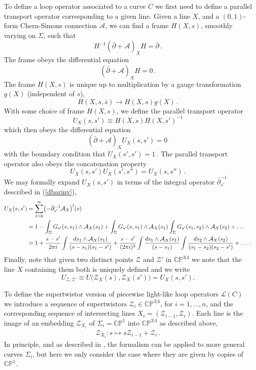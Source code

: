 \documentclass[12pt]{article}
\def \be  {\begin{equation}}
\def \ee  {\end{equation}}
\numberwithin{equation}{section}
\begin{document}
To define a loop operator associated to a curve $C$ we first need to define a parallel transport operator corresponding to a given line.
Given a line $X$, and a $(0,1)$-form Chern-Simons connection $\mathcal{A}$, we can find a frame $H(X,s)$, smoothly varying on $\Sigma$, such that
\be
H^{-1} (\bar{\partial} + \mathcal{A})_X H = \bar{\partial}\,.
\ee
The frame obeys the differential equation
\be
(\bar{\partial} + \mathcal{A})_X H = 0\,.
\ee
The frame $H(X,s)$ is unique up to multiplication by a gauge transformation $g(X)$ (independent of $s$),
\be
H(X,s,\bar{s}) \rightarrow H(X,s) g(X)\,.
\ee
With some choice of frame $H(X,s)$, we define the parallel transport operator
\be
U_X(s,s') \equiv H(X,s) H(X,s')^{-1} 
\ee
which then obeys the differential equation
\be
(\bar{\partial} + \mathcal{A})_{X} U_X(s,s') = 0\,
\label{Ueq}
\ee
with the boundary condition that $U_X(s',s') = 1$\,. The parallel transport operator also obeys the concatenation property
\be
U_X(s,s')U_X(s',s'') = U_X(s,s'')\,.
\ee
We may formally expand $U_X(s,s')$ in terms of the integral operator $\bar{\partial}_{s'}^{-1}$ described in (\ref{dbarinv}),
\begin{align}
\label{UXss'} 
U_{X}(s,s') &= \sum_{l=0}^{\infty} \bigl(-\bar{\partial}_{s'}^{-1} \mathcal{A}_{X}\bigr)^{l}(s) \\
&= 1 - \int_{\Sigma} G_{s'}(s,s_1) \wedge \mathcal{A}_{X}(s_1) + \int_{\Sigma} G_{s'}(s,s_1) \wedge \mathcal{A}_{X}(s_1) \int_{\Sigma} G_{s'}(s_1,s_2) \wedge \mathcal{A}_{X}(s_2) + \ldots\, \notag \\
&= 1 + \frac{s-s'}{2 \pi i} \int  \frac{ds_1 \wedge \mathcal{A}_{X}(s_1)}{(s-s_1)(s_1-s')} + \frac{s-s'}{(2 \pi i)^2} \int \frac{ds_1 \wedge \mathcal{A}_{X}(s_1)}{(s-s_1)} \int \frac{ds_2 \wedge \mathcal{A}_{X}(s_2)}{(s_1-s_2)(s_2-s')} + \ldots\,. \notag
\end{align}
Finally, note that given two distinct points $\mathcal{Z}$ and $\mathcal{Z}'$ in $\mathbb{CP}^{3|4}$ we note that the line $X$ containing them both is uniquely defined and we write
\be
U_{\mathcal{Z},\mathcal{Z}'} \equiv U\bigl(\mathcal{Z}_X(s),\mathcal{Z}_X(s')\bigr) = U_X(s,s').
\ee

To define the supertwistor version of piecewise light-like loop operators $\mathcal{L}(C)$ we introduce a sequence of supertwistors $\mathcal{Z}_i \in \mathbb{CP}^{3|4}$, for $i=1,\ldots,n$, and the corresponding sequence of intersecting lines $X_i = (\mathcal{Z}_{i-1} , \mathcal{Z}_i)$. Each line is the image of an embedding $\mathcal{Z}_{X_i}$ of $\Sigma_i = \mathbb{CP}^1$ into $\mathbb{CP}^{3|4}$ as described above,
\begin{align}
\mathcal{Z}_{X_i} : s \mapsto s \mathcal{Z}_{i-1} + \mathcal{Z}_i\,.
\end{align}
In principle, and as described in \cite{Bullimore:2011ni}, the formalism can be applied to more general curves $\Sigma_i$, but here we only consider the case where they are given by copies of $\mathbb{CP}^1$.
\end{document}
